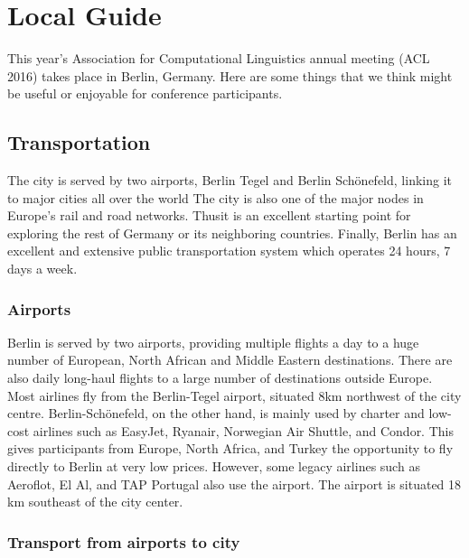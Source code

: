 
\chapter{Local Guide}

This year's Association for Computational Linguistics annual meeting (ACL 2016) takes place in Berlin, Germany. Here are some things that we think might be useful or enjoyable for conference participants.

\section{Transportation}

The  city  is  served  by  two airports, Berlin Tegel and Berlin Sch\"{o}nefeld, linking it to  major cities all over the world The city is also one of the major nodes in Europe's rail and road networks. Thusit is an excellent starting point for exploring the rest of  Germany  or  its  neighboring countries. Finally, Berlin has an excellent and extensive public transportation system which operates 24 hours, 7 days a week.

\subsection{Airports}

Berlin is served by two airports, providing multiple flights a day to a huge number of European, North African and Middle Eastern destinations. There are also daily long-haul flights to a large number of destinations outside Europe. Most airlines fly from the Berlin-Tegel airport, situated 8km northwest of the city centre. Berlin-Sch\"{o}nefeld, on the other hand, is mainly used by charter and low-cost airlines such as EasyJet, Ryanair, Norwegian Air Shuttle, and Condor. This gives participants from Europe, North Africa, and Turkey the opportunity to fly directly to Berlin at very low prices. However, some legacy airlines such as Aeroflot, El Al, and TAP Portugal also use the airport. The airport is situated 18 km southeast of the city center.

\subsection{Transport from airports to city}

